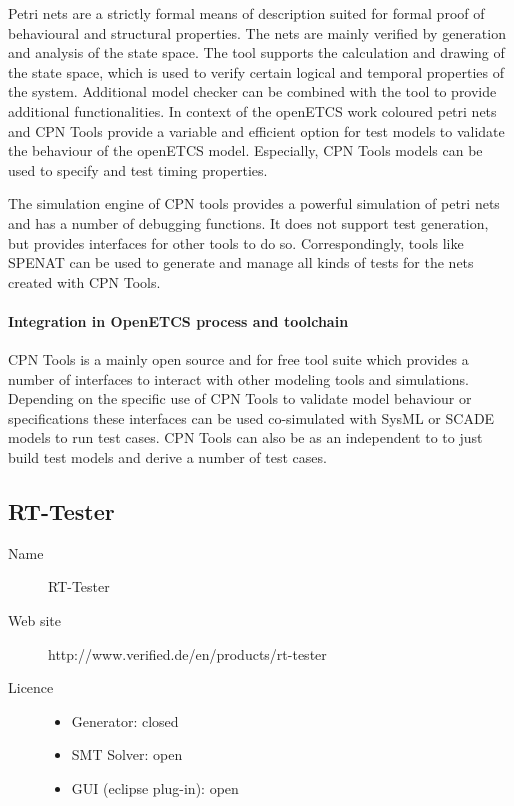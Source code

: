 Petri nets are a strictly formal means of description suited for formal proof of behavioural and structural properties. The nets are mainly verified by generation and analysis of the state space. The tool supports the calculation and drawing of the state space, which is used to verify certain logical and temporal properties of the system. Additional model checker can be combined with the tool to provide additional functionalities. In context of the openETCS work coloured petri nets and CPN Tools provide a variable and efficient option for test models to validate the behaviour of the openETCS model. Especially, CPN Tools models can be used to specify and test timing properties.

The simulation engine of CPN tools provides a powerful simulation of petri nets and has a number of debugging functions. It does not support test generation, but provides interfaces for other tools to do so. Correspondingly, tools like SPENAT can be used to generate and manage all kinds of tests for the nets created with CPN Tools. 

\paragraph{Integration in OpenETCS process and toolchain}

CPN Tools is a mainly open source and for free tool suite which provides a number of interfaces to interact with other modeling tools and simulations. Depending on the specific use of CPN Tools to validate model behaviour or specifications these interfaces can be used co-simulated with SysML or SCADE models to run test cases. CPN Tools can also be as an independent to to just build test models and derive a number of test cases. 

\subsection{RT-Tester}
\label{sec:RT-Tester}

\begin{description}
\item[Name] RT-Tester
\item[Web site] http://www.verified.de/en/products/rt-tester
\item[Licence] 
  \begin{itemize}
    \item Generator:  closed
    \item SMT Solver: open
    \item GUI (eclipse plug-in): open
  \end{itemize}
\end{description}

